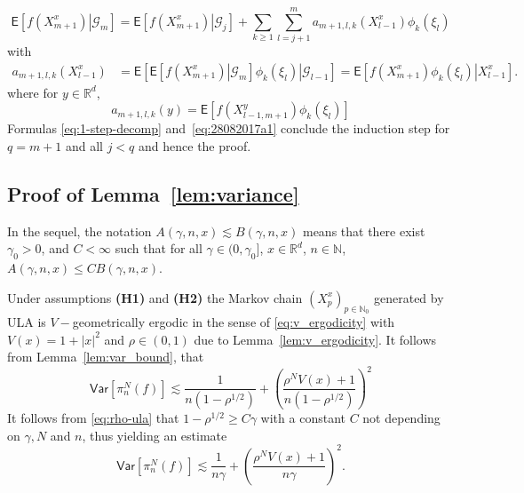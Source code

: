 \documentclass[bj]{imsart}
\def\PVar{\mathsf{Var}}
\def\nset{\mathbb{N}}
\def\rset{\mathbb{R}}
\def\rset{\mathbb{R}}
\begin{document}
\begin{equation}\label{eq:28082017a1}
\mathsf{E}\left[\left.f(X^x_{m+1})\right| \mathcal{G}_m \right]=\mathsf{E}\left[\left.f(X^x_{m+1})\right| \mathcal{G}_j \right]+\sum_{k\geq1}\sum_{l=j+1}^{m}a_{m+1,l,k}(X^x_{l-1})\phi_{k}(\xi_{l})
\end{equation}
with
\begin{align*}
a_{m+1,l,k}(X^x_{l-1}) &= \mathsf{E}\left[\left.\mathsf{E}\left[\left.f(X^x_{m+1})\right|\mathcal{G}_{m}\right]\phi_{k}(\xi_{l})\right|\mathcal{G}_{l-1}\right]
 = \mathsf{E}\left[\left.f(X^x_{m+1})\phi_{k}(\xi_{l})\right|X^x_{l-1}\right].
\end{align*}
where for $y \in \rset^d$,
\[
a_{m+1,l,k}(y) = \mathsf{E}\left[f(X^y_{l-1,m+1})\phi_{k}(\xi_{l})\right]
\]
Formulas \eqref{eq:1-step-decomp}
and~\eqref{eq:28082017a1} conclude the induction step for $q = m+1$ and all $j < q$ and hence the proof.


\subsection{Proof of Lemma~\ref{lem:variance}}
In the sequel, the notation $A(\gamma,n,x) \lesssim B(\gamma,n,x)$ means that there exist $\gamma_0 > 0$, and $C < \infty$ such that for all  $\gamma \in (0,\gamma_0]$, $x \in \rset^d$, $n \in \nset$, $A(\gamma,n,x) \leq C B(\gamma,n,x)$.

Under assumptions {\bf (H1)} and {\bf (H2)} the Markov chain $(X^x_{p})_{p \in \nset_0}$ generated by ULA  is $V-$geometrically ergodic in the sense of \eqref{eq:v_ergodicity} with $V(x) = 1+|x|^2$ and $\rho\in (0,1) $ due to Lemma~\ref{lem:v_ergodicity}. It follows from Lemma~\ref{lem:var_bound}, that
\[
\PVar[\pi_n^N(f)]\lesssim \frac{1}{n(1-\rho^{1/2})} + \left(\frac{\rho^NV(x)+1}{n(1-\rho^{1/2})}\right)^2
\]
It follows from \eqref{eq:rho-ula} that $1-\rho^{1/2} \geq C\gamma$ with a constant $C$ not depending on $\gamma,N$ and $n$, thus yielding an estimate
\[
\PVar[\pi_n^N(f)] \lesssim \frac{1}{n\gamma} + \left(\frac{\rho^NV(x)+1}{n\gamma}\right)^2.
\]
\end{document}
